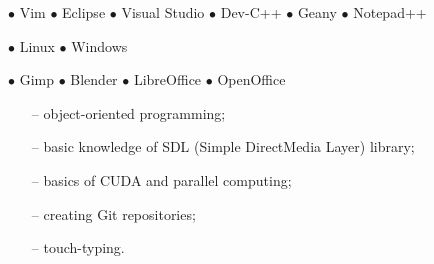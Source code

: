 \documentclass[11pt,a4paper]{article}
\begin{document}
  
    \bigskip
  
    \medskip
    \centerline{
        \hfill
        $\bullet$ Vim
        \hfill
        $\bullet$ Eclipse
        \hfill
        $\bullet$ Visual Studio
        \hfill
        $\bullet$ Dev-C++
        \hfill
        $\bullet$ Geany
        \hfill
        $\bullet$ Notepad++
        \hfill
    }
  
    \bigskip
    \noindent
    \begin{minipage}[t]{0.35\textwidth}
  
        
        
        \medskip
        \centerline{
            \hfill
            $\bullet$ Linux
            \hfill
            $\bullet$ Windows
            \hfill
        }
    \end{minipage}
    \begin{minipage}[t]{0.65\textwidth}
  
        
        
        \medskip
        \centerline{
            \hfill
            $\bullet$ Gimp
            \hfill
            $\bullet$ Blender
            \hfill
            $\bullet$ LibreOffice
            \hfill
            $\bullet$ OpenOffice
            \hfill
        }
    \end{minipage}
  
  
    \bigskip
    \vspace{-1mm}
    \begin{itemize} \itemsep2pt \parskip0pt 
        \item[--] object-oriented programming;
        \item[--] basic knowledge of SDL (Simple DirectMedia Layer) library;
        \item[--] basics of CUDA and parallel computing;
        \item[--] creating Git repositories;
        \item[--] touch-typing.
    \end{itemize}
  
\end{document}
